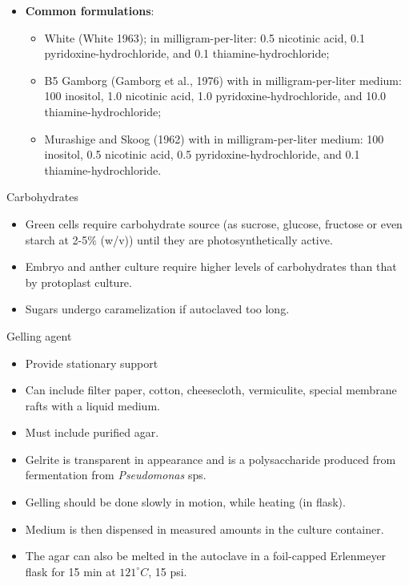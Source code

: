 \documentclass[
  ignorenonframetext,
  aspectratio=169]{beamer}
\providecommand{\tightlist}{%
  \setlength{\itemsep}{0pt}\setlength{\parskip}{0pt}}
\begin{document}
\begin{frame}{}
\protect\hypertarget{section-8}{}
\begin{itemize}
\item
  \textbf{Common formulations}:

  \begin{itemize}
  \tightlist
  \item
    White (White 1963); in milligram-per-liter: 0.5 nicotinic acid, 0.1
    pyridoxine-hydrochloride, and 0.1 thiamine-hydrochloride;
  \item
    B5 Gamborg (Gamborg et al., 1976) with in milligram-per-liter
    medium: 100 inositol, 1.0 nicotinic acid, 1.0
    pyridoxine-hydrochloride, and 10.0 thiamine-hydrochloride;
  \item
    Murashige and Skoog (1962) with in milligram-per-liter medium: 100
    inositol, 0.5 nicotinic acid, 0.5 pyridoxine-hydrochloride, and 0.1
    thiamine-hydrochloride.
  \end{itemize}
\end{itemize}
\end{frame}

\begin{frame}{Carbohydrates}
\protect\hypertarget{carbohydrates}{}
\begin{itemize}
\tightlist
\item
  Green cells require carbohydrate source (as sucrose, glucose, fructose
  or even starch at 2-5\% (w/v)) until they are photosynthetically
  active.
\item
  Embryo and anther culture require higher levels of carbohydrates than
  that by protoplast culture.
\item
  Sugars undergo caramelization if autoclaved too long.
\end{itemize}
\end{frame}

\begin{frame}{Gelling agent}
\protect\hypertarget{gelling-agent}{}
\begin{itemize}
\tightlist
\item
  Provide stationary support
\item
  Can include filter paper, cotton, cheesecloth, vermiculite, special
  membrane rafts with a liquid medium.
\item
  Must include \alert{purified} agar.
\item
  Gelrite is transparent in appearance and is a polysaccharide produced
  from fermentation from \emph{Pseudomonas} sps.
\item
  Gelling should be done slowly in motion, while heating (in flask).
\item
  Medium is then dispensed in measured amounts in the culture container.
\item
  The agar can also be melted in the autoclave in a foil-capped
  Erlenmeyer flask for 15 min at \(121^\circ C\), 15 psi.
\end{itemize}
\end{frame}
\end{document}

